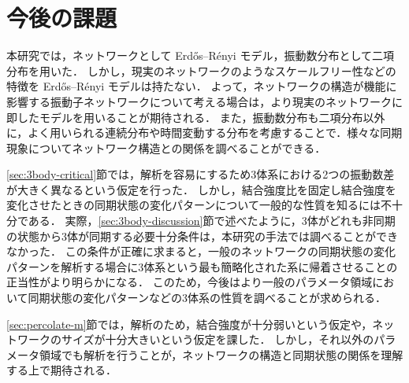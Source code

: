 \documentclass[../main]{subfiles}
\begin{document}
\section{今後の課題}
本研究では，ネットワークとして Erd\H{o}s–R\'{e}nyi モデル，振動数分布として二項分布を用いた．
しかし，現実のネットワークのようなスケールフリー性などの特徴を Erd\H{o}s–R\'{e}nyi モデルは持たない．
よって，ネットワークの構造が機能に影響する振動子ネットワークについて考える場合は，より現実のネットワークに即したモデル\cite{Moreno_2004}を用いることが期待される．
また，振動数分布も二項分布以外に，よく用いられる連続分布\cite{RevModPhys.77.137}や時間変動する分布\cite{CUMIN2007181}を考慮することで．様々な同期現象についてネットワーク構造との関係を調べることができる．

\ref{sec:3body-critical}節では，解析を容易にするため3体系における2つの振動数差が大きく異なるという仮定を行った．
しかし，結合強度比を固定し結合強度を変化させたときの同期状態の変化パターンについて一般的な性質を知るには不十分である．
実際，\ref{sec:3body-discussion}節で述べたように，3体がどれも非同期の状態から3体が同期する必要十分条件は，本研究の手法では調べることができなかった．
この条件が正確に求まると，一般のネットワークの同期状態の変化パターンを解析する場合に3体系という最も簡略化された系に帰着させることの正当性がより明らかになる．
このため，今後はより一般のパラメータ領域において同期状態の変化パターンなどの3体系の性質を調べることが求められる．

\ref{sec:percolate-m}節では，解析のため，結合強度が十分弱いという仮定や，ネットワークのサイズが十分大きいという仮定を課した．
しかし，それ以外のパラメータ領域でも解析を行うことが，ネットワークの構造と同期状態の関係を理解する上で期待される．
\end{document}
